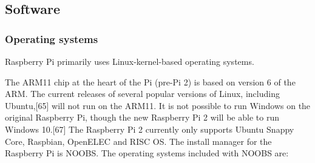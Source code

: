 \documentclass{acm_proc_article-sp}
\begin{document}
\subsection{Software}


\subsubsection{Operating systems}
Raspberry Pi primarily uses Linux-kernel-based operating systems.

The ARM11 chip at the heart of the Pi (pre-Pi 2) is based on version 6 of the ARM. The current releases of several popular versions of Linux, including Ubuntu,[65] will not run on the ARM11. It is not possible to run Windows on the original Raspberry Pi, though the new Raspberry Pi 2 will be able to run Windows 10.[67] The Raspberry Pi 2 currently only supports Ubuntu Snappy Core, Raspbian, OpenELEC and RISC OS.
\newline
\newline
The install manager for the Raspberry Pi is NOOBS. The operating systems included with NOOBS are:
\end{document}
